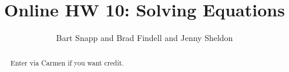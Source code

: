 \documentclass[]{xourse}
\title{Online HW 10: Solving Equations}
\author{Bart Snapp and Brad Findell and Jenny Sheldon}
\begin{document}
\begin{abstract}
Enter via Carmen if you want credit.   
\end{abstract}
\maketitle


\end{document}
